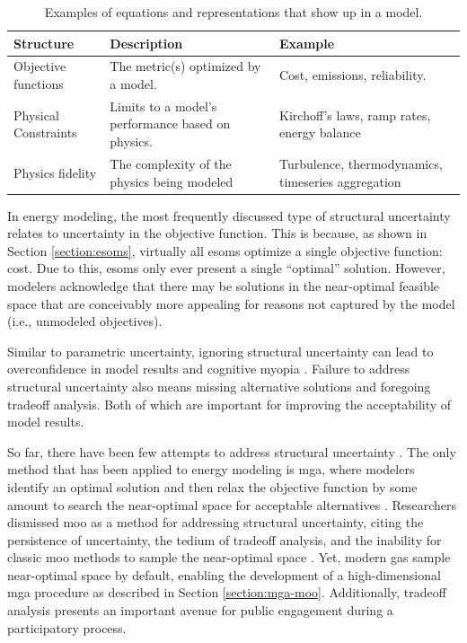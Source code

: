 \begin{table}[ht!]
    \centering
    \caption{Examples of equations and representations that show up in a model.}
    \label{tab:structural-examples}
    \begin{tabularx}{\columnwidth}{ll X}
        \toprule
        Structure&Description&Example\\
        \midrule
        Objective functions& The metric(s) optimized by a model. & Cost,
        emissions, reliability.\\
        Physical Constraints & Limits to a model's performance based on physics.
        & Kirchoff's laws, ramp rates, energy balance \\
        Physics fidelity& The complexity of the physics being modeled &
        Turbulence, thermodynamics, timeseries aggregation\\
        \bottomrule
    \end{tabularx}
\end{table}

In energy modeling, the most frequently discussed type of structural uncertainty
relates to uncertainty in the objective function. This is because, as shown in
Section \ref{section:esoms}, virtually all \acp{esom} optimize a single
objective function: cost. Due to this, \acp{esom} only ever present a single
``optimal'' solution. However, modelers acknowledge that there may be solutions
in the near-optimal feasible space that are conceivably more appealing for
reasons not captured by the model (i.e., unmodeled objectives). 

Similar to parametric uncertainty, ignoring structural uncertainty can lead to
overconfidence in model results and cognitive myopia
\cite{decarolis_using_2011,decarolis_modelling_2016}. Failure to address
structural uncertainty also means missing alternative solutions and foregoing
tradeoff analysis. Both of which are important for improving the acceptability
of model results.

So far, there have been few attempts to address structural uncertainty
\cite{yue_review_2018}. The only method that has been applied to energy modeling
is \acf{mga}, where modelers identify an optimal solution and then relax the
objective function by some amount to search the near-optimal space for
acceptable alternatives
\cite{decarolis_modelling_2016,neumann_near-optimal_2021,price_modelling_2017,yue_review_2018}.
Researchers dismissed \acf{moo} as a method for addressing structural
uncertainty, citing the persistence of uncertainty, the tedium of tradeoff
analysis, and the inability for classic \ac{moo} methods to sample the
near-optimal space \cite{decarolis_using_2011}. Yet, modern \acfp{ga} sample
near-optimal space by default, enabling the development of a high-dimensional
\ac{mga} procedure as described in Section \ref{section:mga-moo}. Additionally,
tradeoff analysis presents an important avenue for public engagement during a
participatory process.

